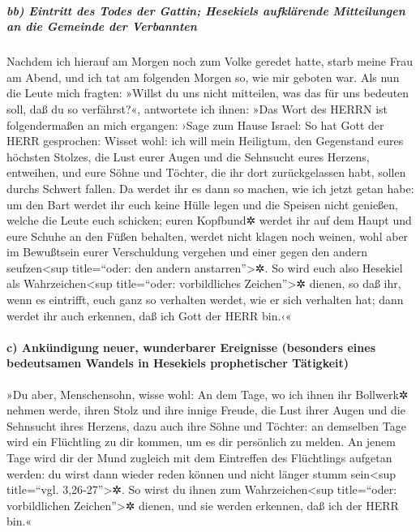 \hypertarget{bb-eintritt-des-todes-der-gattin-hesekiels-aufkluxe4rende-mitteilungen-an-die-gemeinde-der-verbannten}{%
\subparagraph{bb) Eintritt des Todes der Gattin; Hesekiels aufklärende
Mitteilungen an die Gemeinde der
Verbannten}\label{bb-eintritt-des-todes-der-gattin-hesekiels-aufkluxe4rende-mitteilungen-an-die-gemeinde-der-verbannten}}

Nachdem ich hierauf am Morgen noch zum Volke geredet
hatte, starb meine Frau am Abend, und ich tat am folgenden Morgen so,
wie mir geboten war. Als nun die Leute mich fragten:
»Willst du uns nicht mitteilen, was das für uns bedeuten soll, daß du so
verfährst?«, antwortete ich ihnen: »Das Wort des HERRN
ist folgendermaßen an mich ergangen: ›Sage zum Hause
Israel: So hat Gott der HERR gesprochen: Wisset wohl: ich will mein
Heiligtum, den Gegenstand eures höchsten Stolzes, die Lust eurer Augen
und die Sehnsucht eures Herzens, entweihen, und eure Söhne und Töchter,
die ihr dort zurückgelassen habt, sollen durchs Schwert fallen.
Da werdet ihr es dann so machen, wie ich jetzt getan
habe: um den Bart werdet ihr euch keine Hülle legen und die Speisen
nicht genießen, welche die Leute euch schicken; euren
Kopfbund✲ werdet ihr auf dem Haupt und eure Schuhe an den Füßen
behalten, werdet nicht klagen noch weinen, wohl aber im Bewußtsein eurer
Verschuldung vergehen und einer gegen den andern seufzen\textless sup
title=``oder: den andern anstarren''\textgreater✲. So
wird euch also Hesekiel als Wahrzeichen\textless sup title=``oder:
vorbildliches Zeichen''\textgreater✲ dienen, so daß ihr, wenn es
eintrifft, euch ganz so verhalten werdet, wie er sich verhalten hat;
dann werdet ihr auch erkennen, daß ich Gott der HERR bin.‹«

\hypertarget{c-ankuxfcndigung-neuer-wunderbarer-ereignisse-besonders-eines-bedeutsamen-wandels-in-hesekiels-prophetischer-tuxe4tigkeit}{%
\paragraph{c) Ankündigung neuer, wunderbarer Ereignisse (besonders eines
bedeutsamen Wandels in Hesekiels prophetischer
Tätigkeit)}\label{c-ankuxfcndigung-neuer-wunderbarer-ereignisse-besonders-eines-bedeutsamen-wandels-in-hesekiels-prophetischer-tuxe4tigkeit}}

»Du aber, Menschensohn, wisse wohl: An dem Tage, wo ich
ihnen ihr Bollwerk✲ nehmen werde, ihren Stolz und ihre innige Freude,
die Lust ihrer Augen und die Sehnsucht ihres Herzens, dazu auch ihre
Söhne und Töchter: an demselben Tage wird ein Flüchtling
zu dir kommen, um es dir persönlich zu melden. An jenem
Tage wird dir der Mund zugleich mit dem Eintreffen des Flüchtlings
aufgetan werden: du wirst dann wieder reden können und nicht länger
stumm sein\textless sup title=``vgl. 3,26-27''\textgreater✲. So wirst du
ihnen zum Wahrzeichen\textless sup title=``oder: vorbildlichen
Zeichen''\textgreater✲ dienen, und sie werden erkennen, daß ich der HERR
bin.«

